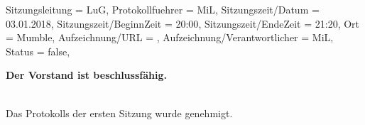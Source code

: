 
\begin{Protokoll}{
        Sitzungsleitung                 = {LuG},             %
        Protokollfuehrer                = {MiL},              %
        Sitzungszeit/Datum              = {03.01.2018},       %
        Sitzungszeit/BeginnZeit         = {20:00},            %
        Sitzungszeit/EndeZeit           = {21:20},            %
        Ort                             = {Mumble},            %
        Aufzeichnung/URL                = {},                %
        Aufzeichnung/Verantwortlicher   = {MiL},                  %
        Status                          = {false},            %
    }
    
    \begin{Anwesenheitsliste}
    \end{Anwesenheitsliste}
    
    \textbf{Der Vorstand ist beschlussfähig.}
    
     \\
    Das {Protokolls der ersten Sitzung} wurde genehmigt.
    
    

\end{Protokoll}
